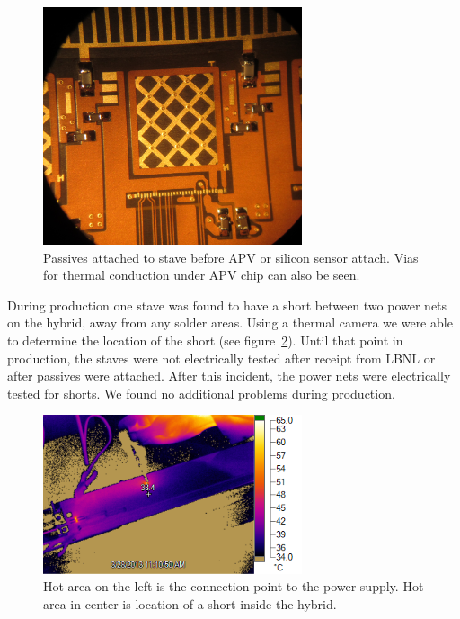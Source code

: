\documentclass[preprint,12pt]{elsarticle}
\begin{document}
\begin{figure}[h]
\begin{center}
\includegraphics[width=3in, keepaspectratio=true, angle=0]{graphics/passive.jpg}
\caption{Passives attached to stave before APV or silicon sensor attach.  Vias
for thermal conduction under APV chip can also be seen.
\label{fig:passive}}
\end{center}
\end{figure}
%
During production one stave was found to have a short between two power nets on
the hybrid, away from any solder areas. Using a thermal camera we were able to
determine the location of the short (see figure~\ref{fig:thermal}). Until that point in production, the staves were not
electrically tested after receipt from LBNL or after passives were attached.
After this incident, the power nets were electrically tested for shorts. We found no
additional problems during production.

\begin{figure}[h]
\begin{center}
\includegraphics[width=3in, keepaspectratio=true, angle=0]{graphics/ir_view.png}
\caption{Hot area on the left is the connection point to the power supply.  Hot area
in center is location of a short inside the hybrid.
\label{fig:thermal}}
\end{center}
\end{figure}
\end{document}
